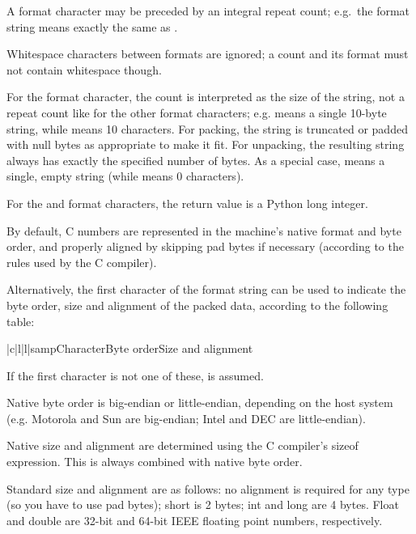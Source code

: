 A format character may be preceded by an integral repeat count; e.g.\
the format string  means exactly the same as .

Whitespace characters between formats are ignored; a count and its
format must not contain whitespace though.

For the  format character, the count is interpreted as the
size of the string, not a repeat count like for the other format
characters; e.g. \code{'10s'} means a single 10-byte string, while
\code{'10c'} means 10 characters.  For packing, the string is
truncated or padded with null bytes as appropriate to make it fit.
For unpacking, the resulting string always has exactly the specified
number of bytes.  As a special case, \code{'0s'} means a single, empty
string (while \code{'0c'} means 0 characters).

For the  and  format characters, the return
value is a Python long integer.

By default, C numbers are represented in the machine's native format
and byte order, and properly aligned by skipping pad bytes if
necessary (according to the rules used by the C compiler).

Alternatively, the first character of the format string can be used to
indicate the byte order, size and alignment of the packed data,
according to the following table:

\begin{tableiii}{|c|l|l|}{samp}{Character}{Byte order}{Size and alignment}
  \lineiii{@}{native}{native}
\end{tableiii}

If the first character is not one of these,  is assumed.

Native byte order is big-endian or little-endian, depending on the
host system (e.g. Motorola and Sun are big-endian; Intel and DEC are
little-endian).

Native size and alignment are determined using the C compiler's sizeof
expression.  This is always combined with native byte order.

Standard size and alignment are as follows: no alignment is required
for any type (so you have to use pad bytes); short is 2 bytes; int and
long are 4 bytes.  Float and double are 32-bit and 64-bit IEEE floating
point numbers, respectively.

